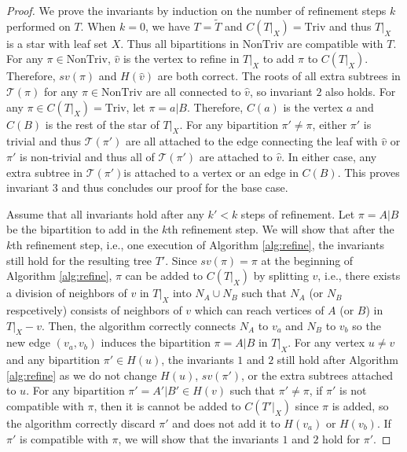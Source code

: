 \documentclass{bmcart}
\newcommand{\triv}{\mathrm{Triv}}
\newcommand{\ntriv}{\mathrm{NonTriv}}
\begin{document}
\begin{proof}
    We prove the invariants by induction on the number of refinement steps $k$ performed on $T$. When $k=0$, we have $T = \tilde{T}$ and $C(T|_X) = \triv$ and thus $T|_X$ is a star with leaf set $X$. Thus all bipartitions in $\ntriv$ are compatible with $T$. For any $\pi \in \ntriv $, $\hat{v}$ is the vertex to refine in $T|_X$ to add $\pi$ to $C(T|_X)$. Therefore, $sv(\pi)$ and $H(\hat{v})$ are both correct. The roots of all extra subtrees in $\mathcal{T}(\pi)$ for any $\pi \in \ntriv$ are all connected to $\hat{v}$, so invariant $2$ also holds. For any $\pi \in C(T|_X) = \triv$, let $\pi = {a}|B$. Therefore, $C({a})$ is the vertex $a$ and $C(B)$ is the rest of the star of $T|_X$. For any bipartition $\pi' \neq \pi$, either $\pi'$ is trivial and thus $\mathcal{T}(\pi')$ are all attached to the edge connecting the leaf with $\hat{v}$ or $\pi'$ is non-trivial and thus all of $\mathcal{T}(\pi')$ are attached to $\hat{v}$. In either case, any extra subtree in $\mathcal{T}(\pi')$is attached to a vertex or an edge in $C(B)$. This proves invariant $3$ and thus concludes our proof for the base case.\smallskip 
    
    Assume that all invariants hold after any $k' < k$ steps of refinement. Let $\pi = A|B$ be the bipartition to add in the $k$th refinement step. We will show that after the $k$th refinement step, i.e., one execution of Algorithm \ref{alg:refine}, the invariants still hold for the resulting tree $T'$. Since $sv(\pi) = \pi$ at the beginning of Algorithm \ref{alg:refine}, $\pi$ can be added to $C(T|_X)$ by splitting $v$, i.e., there exists a division of neighbors of $v$ in $T|_X$ into $N_A \cup N_B$ such that $N_A$ (or $N_B$ respcetively) consists of neighbors of $v$ which can reach vertices of $A$ (or $B$) in $T|_X-v$. Then, the algorithm correctly connects $N_A$ to $v_a$ and $N_B$ to $v_b$ so the new edge $(v_a,v_b)$ induces the bipartition $\pi = A|B$ in $T|_X$. For any vertex $u \neq v$ and any bipartition $\pi' \in H(u)$, the invariants $1$ and $2$ still hold after Algorithm \ref{alg:refine} as we do not change $H(u)$, $sv(\pi')$, or the extra subtrees attached to $u$. For any bipartition $\pi' = A'|B' \in H(v)$ such that $\pi' \neq \pi$, if $\pi'$ is not compatible with $\pi$, then it is cannot be added to $C(T'|_X)$ since $\pi$ is added, so the algorithm correctly discard $\pi'$ and does not add it to $H(v_a)$ or $H(v_b)$. If $\pi'$ is compatible with $\pi$, we will show that the invariants $1$ and $2$ hold for $\pi'$.\smallskip
    

\end{proof}
\end{document}
